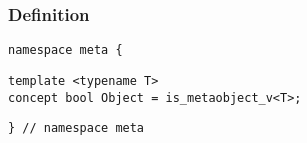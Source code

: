 
\subsubsection{Definition}

\begin{verbatim}
namespace meta {
\end{verbatim}
\begin{verbatim}
template <typename T>
concept bool Object = is_metaobject_v<T>;

\end{verbatim}
\begin{verbatim}
} // namespace meta
\end{verbatim}
